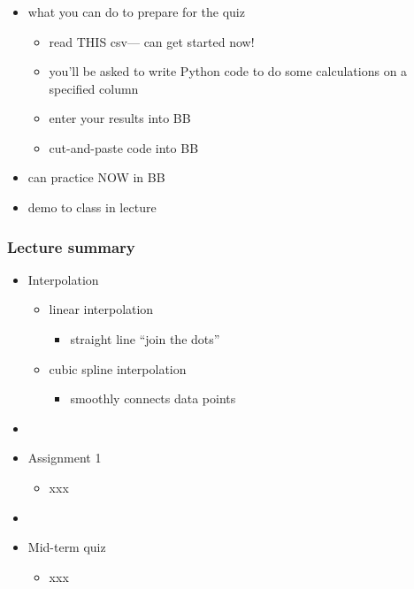 \documentclass[english,14pt]{beamer}
\begin{document}
\begin{frame}[fragile]

\frametitle{}

\begin{itemize}
	\item what you can do to prepare for the quiz
	\begin{itemize}
		\item read THIS csv--- can get started now!
		\item you'll be asked to write Python code to do some calculations on a specified column
		\item enter your results into BB
		\item cut-and-paste code into BB
	\end{itemize}
	\item can practice NOW in BB
	\item demo to class in lecture
\end{itemize}

\end{frame}


\begin{frame}[fragile]

\frametitle{Lecture summary}
\begin{itemize}
	\item Interpolation
	\begin{itemize}
		\item linear interpolation
		\begin{itemize}
			\item straight line ``join the dots''
		\end{itemize}
		\item cubic spline interpolation
		\begin{itemize}
			\item smoothly connects data points
		\end{itemize}
	\end{itemize}

	\item[]
	
	\item Assignment 1
	\begin{itemize}
		\item xxx
	\end{itemize}

	\item[]
	
	\item Mid-term quiz
		\begin{itemize}
			\item xxx
		\end{itemize}
		
\end{itemize}
\end{frame}
\end{document}
